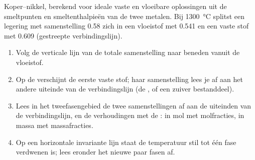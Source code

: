 \begin{omfigure}

{\small Koper--nikkel, berekend voor ideale vaste en vloeibare oplossingen uit de
smeltpunten en smeltenthalpieën van de twee metalen. Bij
\qty{1300}{\degreeCelsius} splitst een legering met samenstelling 0.58 zich in een vloeistof
met 0.541 en een vaste stof met 0.609 (gestreepte verbindingslijn).}
\end{omfigure}

\begin{method}\label{met:b2:solid-liquid-diagrams:read-solid-liquid}
\begin{enumerate}
  \item Volg de verticale lijn van de totale samenstelling naar beneden vanuit de
        vloeistof.
  \item Op de  verschijnt de eerste vaste stof; haar samenstelling lees je af aan
        het andere uiteinde van de verbindingslijn (de , of een zuiver bestanddeel).
  \item Lees in het tweefasengebied de twee samenstellingen af aan de uiteinden van de
        verbindingslijn, en de verhoudingen met de : in mol met
        molfracties, in massa met massafracties.
  \item Op een horizontale invariante lijn staat de temperatuur stil tot één fase
        verdwenen is; lees eronder het nieuwe paar fasen af.
\end{enumerate}
\end{method}

